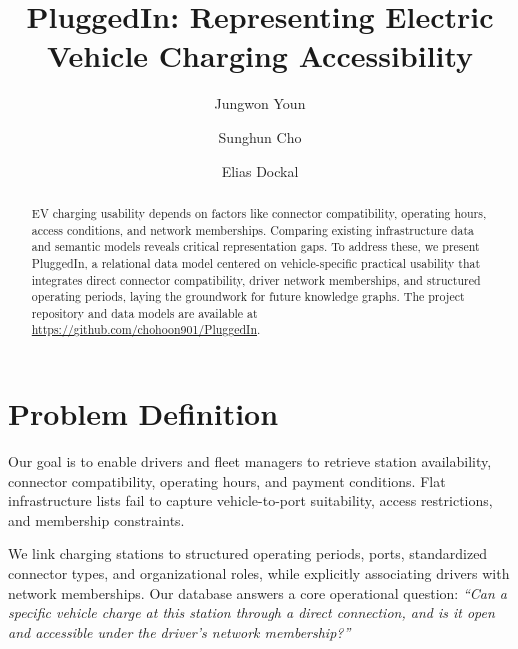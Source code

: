 \documentclass[sigconf,screen,nonacm]{acmart}
\begin{document}
\title{PluggedIn: Representing Electric Vehicle Charging Accessibility}

\author{Jungwon Youn}

\author{Sunghun Cho}

\author{Elias Dockal}

\renewcommand{\shortauthors}{Youn, Cho, and Dockal}

\begin{abstract}
EV charging usability depends on factors like connector compatibility, operating hours, access conditions, and network memberships. Comparing existing infrastructure data and semantic models reveals critical representation gaps. To address these, we present PluggedIn, a relational data model centered on vehicle-specific practical usability that integrates direct connector compatibility, driver network memberships, and structured operating periods, laying the groundwork for future knowledge graphs. The project repository and data models are available at \url{https://github.com/chohoon901/PluggedIn}.
\end{abstract}


\maketitle

\section{Problem Definition}
Our goal is to enable drivers and fleet managers to retrieve station availability, connector compatibility, operating hours, and payment conditions. Flat infrastructure lists fail to capture vehicle-to-port suitability, access restrictions, and membership constraints. 

We link charging stations to structured operating periods, ports, standardized connector types, and organizational roles, while explicitly associating drivers with network memberships. Our database answers a core operational question: \textit{``Can a specific vehicle charge at this station through a direct connection, and is it open and accessible under the driver's network membership?''}
\end{document}
